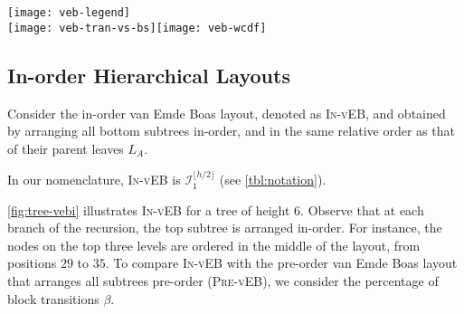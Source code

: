 \documentclass[10pt,conference,letterpaper]{IEEEtran}
\newcommand{\comment}[1]{}
\newcommand{\nodes}{nodes\xspace}
\newcommand{\vEBl}{van Emde Boas layout\xspace}
\newcommand{\HLs}{Hierarchical Layouts\xspace}
\newcommand{\pvl}{\textsc{Pre-vEB}\xspace}
\newcommand{\ivl}{\textsc{In-vEB}\xspace}
\newcommand{\IN}{\ensuremath{\mathcal{I}}\xspace}
\newcommand{\FLOOR}[1]{\ensuremath{\lfloor #1 \rfloor}\xspace}
\newcommand{\PB}{\ensuremath{\beta}\xspace}
\begin{document}
\begin{figure*}[tp]
\centering \texttt{[image: veb-legend]}\\[1ex]\texttt{[image: veb-tran-vs-bs]}\hfill \texttt{[image: veb-wcdf]}\caption{
  Two locality measures for several layouts of a tree of height $h = 20$.
  Left: Block transitions \PB as a function block size (lower is better).
  Right: Cumulative distribution of edge weights as a function of edge length (higher is better).
}
\label{fig:bt-in-pre}
\end{figure*}

\subsection{In-order \HLs}

Consider the in-order \vEBl, denoted as \ivl, and obtained by
arranging all bottom subtrees in-order, and in the same relative order as that of their parent leaves $L_A$. 
\comment{
wherein the top subtree lies in the middle of all the bottom subtrees.
following ordering of the subtrees, ordered consecutively in memory as $B_1, \ldots, B_{2^{g-1}}, A, B_{2^{g-1}+1}, \ldots, B_{2^g}$.
When $g = \FLOOR{h/2}$, we refer to this version as the in-order \vEBl, and 
which we denote as \ivl.
}
\comment{Observe that the bottom subtrees are not in boldface, since they are not going to be arranged in pre-order. We call the bottom subtrees $B_1, \ldots, B^{2^{g-1}}$ the left bottom subtrees, and others the right bottom subtrees}
In our nomenclature, \ivl is $\IN^{\FLOOR{h/2}}_1$ (see \autoref{tbl:notation}).
\comment{After the top subtree has been completely ordered, consider the leftmost $2^{g-2}$ parent leaves in $L_A$, and choose their children to be the left bottom subtrees. Once we choose the left and the right bottom subtrees, similar to \pvl, we arrange the bottom subtrees in \ivl in the same order as the order of their parent leaves $L_A$. (Later, in \autoref{sec:ivlpp}, we will see why this is the correct choice.) 
}
\autoref{fig:tree-vebi} illustrates \ivl for a tree of height $6$. Observe that at each branch of the recursion, the top subtree is arranged in-order. For instance, the \nodes on the top three levels are ordered in the middle of the layout, from positions $29$ to $35$. 
To compare \ivl with the pre-order \vEBl that arranges all subtrees pre-order (\pvl), we consider the percentage of block transitions \PB.
\comment{
So far, we have considered two versions of the \vEBl, either all subtrees arranged in-order (\ivl), or all subtrees arranged pre-order (\pvl). 
}
\end{document}
